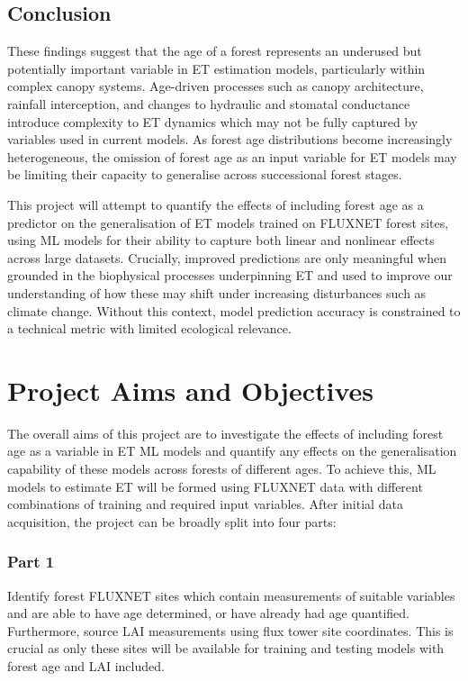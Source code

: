 \documentclass[paper=a4,fontsize=12pt]{scrartcl}
\begin{document}
\subsection{Conclusion}
These findings suggest that the age of a forest represents an underused but potentially important variable in ET estimation models, particularly within complex canopy systems. Age-driven processes such as canopy architecture, rainfall interception, and changes to hydraulic and stomatal conductance introduce complexity to ET dynamics which may not be fully captured by variables used in current models. As forest age distributions become increasingly heterogeneous, the omission of forest age as an input variable for ET models may be limiting their capacity to generalise across successional forest stages. 
\par This project will attempt to quantify the effects of including forest age as a predictor on the generalisation of ET models trained on FLUXNET forest sites, using ML models for their ability to capture both linear and nonlinear effects across large datasets. Crucially, improved predictions are only meaningful when grounded in the biophysical processes underpinning ET and used to improve our understanding of how these may shift under increasing disturbances such as climate change. Without this context, model prediction accuracy is constrained to a technical metric with limited ecological relevance.




\newpage
\section{Project Aims and Objectives}
The overall aims of this project are to investigate the effects of including forest age as a variable in ET ML models and quantify any effects on the generalisation capability of these models across forests of different ages. To achieve this, ML models to estimate ET will be formed using FLUXNET data with different combinations of training and required input variables. After initial data acquisition, the project can be broadly split into four parts:

\subsubsection*{Part 1}
Identify forest FLUXNET sites which contain measurements of suitable variables and are able to have age determined, or have already had age quantified. Furthermore, source LAI measurements using flux tower site coordinates. This is crucial as only these sites will be available for training and testing models with forest age and LAI included.
\end{document}
